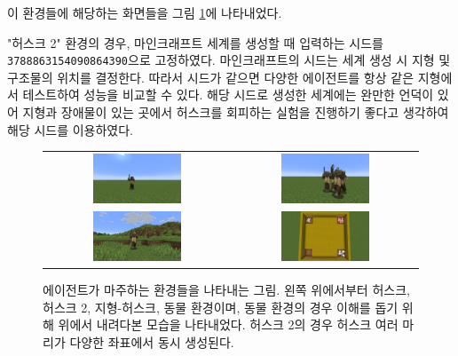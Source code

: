\documentclass[oneside, under, ko]{snuthesis}
\begin{document}
이 환경들에 해당하는 화면들을 그림 \ref{fig:environment_images}에 나타내었다.

"허스크 2" 환경의 경우, 마인크래프트 세계를 생성할 때 입력하는 시드를 \lstinline{3788863154090864390}으로 고정하였다. 마인크래프트의 시드는 세계 생성 시 지형 및 구조물의 위치를 결정한다. 따라서 시드가 같으면 다양한 에이전트를 항상 같은 지형에서 테스트하여 성능을 비교할 수 있다. 해당 시드로 생성한 세계에는 완만한 언덕이 있어 지형과 장애물이 있는 곳에서 허스크를 회피하는 실험을 진행하기 좋다고 생각하여 해당 시드를 이용하였다.

\begin{figure}[htp]
    \centering
    \begin{tabular}{cc}
        \includegraphics[width=0.5\textwidth]{env_husk} & \includegraphics[width=0.5\textwidth]{env_husks} \\
        \includegraphics[width=0.5\textwidth]{env_terrain_husk} & \includegraphics[width=0.5\textwidth]{env_animal} \\
    \end{tabular}
    \caption{에이전트가 마주하는 환경들을 나타내는 그림. 왼쪽 위에서부터 허스크, 허스크 2, 지형-허스크, 동물 환경이며, 동물 환경의 경우 이해를 돕기 위해 위에서 내려다본 모습을 나타내었다. 허스크 2의 경우 허스크 여러 마리가 다양한 좌표에서 동시 생성된다.}
    \label{fig:environment_images}
\end{figure}
\end{document}
